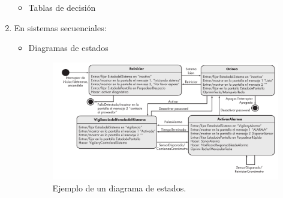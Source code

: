 \begin{enumerate}
\begin{itemize}
        
        \item Tablas de decisión
            \begin{table}[h!]
                \centering
                \caption{Ejemplo de tabla de decisiones de un proceso.}
            \end{table}
    \end{itemize}
    \item En sistemas secuenciales:
    \begin{itemize}
        \item Diagramas de estados
        \begin{figure}[h!]
          \centering
          \includegraphics[width=0.9\linewidth]{Resources/estados}
          \caption{Ejemplo de un diagrama de estados.}
        \end{figure}


\end{itemize}
\end{enumerate}

